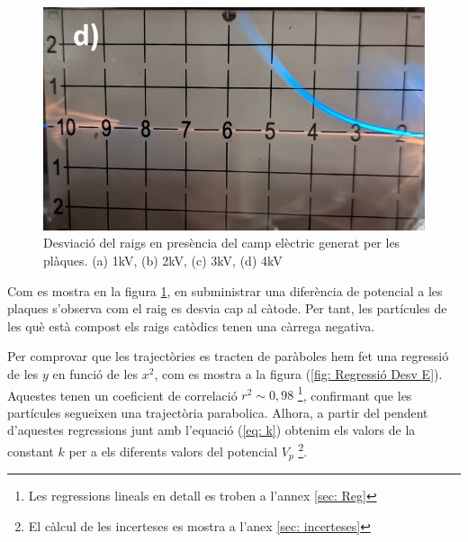 \documentclass[11pt]{article}
\begin{document}
\begin{figure}[h]
\begin{minipage}{0.38\textwidth}
    \end{minipage}
    \begin{minipage}{0.38\textwidth}
        \centering
        \includegraphics[width=\textwidth]{4kV.jpg}
    \end{minipage}
    \caption{Desviació del raigs en presència del camp elèctric generat per les plàques. (a) 1kV, (b) 2kV, (c) 3kV, (d) 4kV}
    \label{fig: Desv E}
\end{figure}

Com es mostra en la figura \ref{fig: Desv E}, en subministrar una diferència de potencial a les plaques s'observa com el raig es desvia cap al càtode. Per tant, les partícules de les què està compost els raigs catòdics tenen una càrrega negativa.

 Per comprovar que les trajectòries es tracten de paràboles hem fet una regressió de les $y$ en funció de les $x^2$, com es mostra a la figura (\ref{fig: Regressió Desv E}). Aquestes tenen un coeficient de correlació $r^2 \sim 0,98$ \footnote{Les regressions lineals en detall es troben a l'annex \ref{sec: Reg}}, confirmant que les partícules segueixen una trajectòria parabolica. Alhora, a partir del pendent d'aquestes regressions junt amb l'equació (\ref{eq: k}) obtenim els valors de la constant $k$ per a els diferents valors del potencial $V_p$ \footnote{El càlcul de les incerteses es mostra a l'anex \ref{sec: incerteses}}.
 
\end{document}
